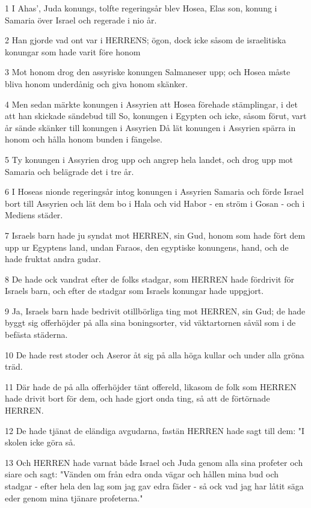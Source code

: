 \par 1 I Ahas', Juda konungs, tolfte regeringsår blev Hosea, Elas son, konung i Samaria över Israel och regerade i nio år.
\par 2 Han gjorde vad ont var i HERRENS; ögon, dock icke såsom de israelitiska konungar som hade varit före honom
\par 3 Mot honom drog den assyriske konungen Salmaneser upp; och Hosea måste bliva honom underdånig och giva honom skänker.
\par 4 Men sedan märkte konungen i Assyrien att Hosea förehade stämplingar, i det att han skickade sändebud till So, konungen i Egypten och icke, såsom förut, vart år sände skänker till konungen i Assyrien Då lät konungen i Assyrien spärra in honom och hålla honom bunden i fängelse.
\par 5 Ty konungen i Assyrien drog upp och angrep hela landet, och drog upp mot Samaria och belägrade det i tre år.
\par 6 I Hoseas nionde regeringsår intog konungen i Assyrien Samaria och förde Israel bort till Assyrien och lät dem bo i Hala och vid Habor - en ström i Gosan - och i Mediens städer.
\par 7 Israels barn hade ju syndat mot HERREN, sin Gud, honom som hade fört dem upp ur Egyptens land, undan Faraos, den egyptiske konungens, hand, och de hade fruktat andra gudar.
\par 8 De hade ock vandrat efter de folks stadgar, som HERREN hade fördrivit för Israels barn, och efter de stadgar som Israels konungar hade uppgjort.
\par 9 Ja, Israels barn hade bedrivit otillbörliga ting mot HERREN, sin Gud; de hade byggt sig offerhöjder på alla sina boningsorter, vid väktartornen såväl som i de befästa städerna.
\par 10 De hade rest stoder och Aseror åt sig på alla höga kullar och under alla gröna träd.
\par 11 Där hade de på alla offerhöjder tänt offereld, likasom de folk som HERREN hade drivit bort för dem, och hade gjort onda ting, så att de förtörnade HERREN.
\par 12 De hade tjänat de eländiga avgudarna, fastän HERREN hade sagt till dem: "I skolen icke göra så.
\par 13 Och HERREN hade varnat både Israel och Juda genom alla sina profeter och siare och sagt: "Vänden om från edra onda vägar och hållen mina bud och stadgar - efter hela den lag som jag gav edra fäder - så ock vad jag har låtit säga eder genom mina tjänare profeterna."
